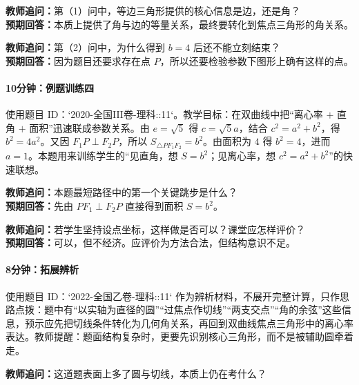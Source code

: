\documentclass[UTF8,a4paper,11pt]{ctexart}
\begin{document}
\noindent\textbf{教师追问：}第（1）问中，等边三角形提供的核心信息是边，还是角？\\

\textbf{预期回答：}本质上提供了角与边的等量关系，最终要转化到焦点三角形的角关系。\par

\noindent\textbf{教师追问：}第（2）问中，为什么得到 $b=4$ 后还不能立刻结束？\\

\textbf{预期回答：}因为题目还要求存在点 $P$，所以还要检验参数下图形上确有这样的点。\par

\paragraph{10分钟：例题训练四}

使用题目 ID：`2020-全国III卷-理科::11`。教学目标：在双曲线中把“离心率 $+$ 直角 $+$ 面积”迅速联成参数关系。由 $e=\sqrt5$ 得 $c=\sqrt5 a$，结合 $c^2=a^2+b^2$，得 $b^2=4a^2$。又因 $F_1P\perp F_2P$，所以 $S_{\triangle PF_1F_2}=b^2$。由面积为 $4$ 得 $b^2=4$，进而 $a=1$。本题用来训练学生的“见直角，想 $S=b^2$；见离心率，想 $c^2=a^2+b^2$”的快速联想。

\noindent\textbf{教师追问：}本题最短路径中的第一个关键跳步是什么？\\

\textbf{预期回答：}先由 $PF_1\perp F_2P$ 直接得到面积 $S=b^2$。\par

\noindent\textbf{教师追问：}若学生坚持设点坐标，这样做是否可以？课堂应怎样评价？\\

\textbf{预期回答：}可以，但不经济。应评价为方法合法，但结构意识不足。\par

\paragraph{8分钟：拓展辨析}

使用题目 ID：`2022-全国乙卷-理科::11` 作为辨析材料，不展开完整计算，只作思路点拨：题中有“以实轴为直径的圆”“过焦点作切线”“两支交点”“角的余弦”这些信息，预示应先把切线条件转化为几何角关系，再回到双曲线焦点三角形中的离心率表达。教师提醒：题面结构复杂时，更要先识别核心三角形，而不是被辅助圆牵着走。

\noindent\textbf{教师追问：}这道题表面上多了圆与切线，本质上仍在考什么？\\
\end{document}
